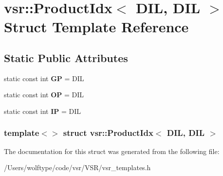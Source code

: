 \hypertarget{structvsr_1_1_product_idx_3_01_d_i_l_00_01_d_i_l_01_4}{\section{vsr\-:\-:Product\-Idx$<$ D\-I\-L, D\-I\-L $>$ Struct Template Reference}
\label{structvsr_1_1_product_idx_3_01_d_i_l_00_01_d_i_l_01_4}
}
\subsection*{Static Public Attributes}
\begin{DoxyCompactItemize}
\item 
\hypertarget{structvsr_1_1_product_idx_3_01_d_i_l_00_01_d_i_l_01_4_ac9788aa2a8b0cdf3e93f3ca226082432}{static const int {\bfseries G\-P} = D\-I\-L}\label{structvsr_1_1_product_idx_3_01_d_i_l_00_01_d_i_l_01_4_ac9788aa2a8b0cdf3e93f3ca226082432}

\item 
\hypertarget{structvsr_1_1_product_idx_3_01_d_i_l_00_01_d_i_l_01_4_a10525e9d094ef1419bff229e32dadaef}{static const int {\bfseries O\-P} = D\-I\-L}\label{structvsr_1_1_product_idx_3_01_d_i_l_00_01_d_i_l_01_4_a10525e9d094ef1419bff229e32dadaef}

\item 
\hypertarget{structvsr_1_1_product_idx_3_01_d_i_l_00_01_d_i_l_01_4_a70243fc423203d3cea54c43af265d2ee}{static const int {\bfseries I\-P} = D\-I\-L}\label{structvsr_1_1_product_idx_3_01_d_i_l_00_01_d_i_l_01_4_a70243fc423203d3cea54c43af265d2ee}

\end{DoxyCompactItemize}
\subsubsection*{template$<$$>$ struct vsr\-::\-Product\-Idx$<$ D\-I\-L, D\-I\-L $>$}



The documentation for this struct was generated from the following file\-:\begin{DoxyCompactItemize}
\item 
/\-Users/wolftype/code/vsr/\-V\-S\-R/vsr\-\_\-templates.\-h\end{DoxyCompactItemize}
